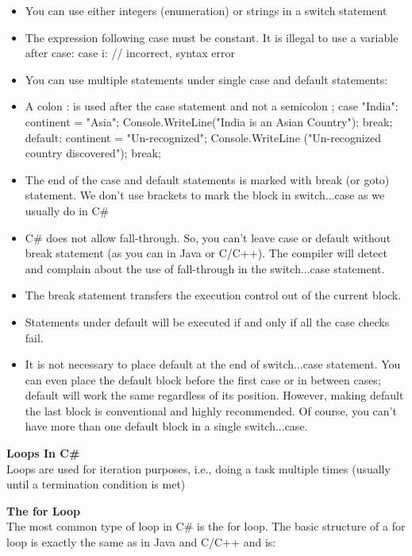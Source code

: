 \begin{itemize}
    \item You can use either integers (enumeration) or strings in a switch statement
    \item The expression following case must be constant. It is illegal to use a variable after case:
    case i: // incorrect, syntax error
    \item You can use multiple statements under single case and default statements:
    \item A colon : is used after the case statement and not a semicolon ;
    case "India":
    continent = "Asia";
    Console.WriteLine("India is an Asian Country");
    break;
    default:
    continent = "Un-recognized";
    Console.WriteLine
    ("Un-recognized country discovered");
    break;
    \item The end of the case and default statements is marked with break (or goto) statement. We don’t use {}
    brackets to mark the block in switch...case as we usually do in C\#
    \item C\# does not allow fall-through. So, you can’t leave case or default without break statement (as you can in
    Java or C/C++). The compiler will detect and complain about the use of fall-through in the switch...case
    statement.
    \item The break statement transfers the execution control out of the current block.
    \item Statements under default will be executed if and only if all the case checks fail.
    \item It is not necessary to place default at the end of switch...case statement. You can even place the default
    block before the first case or in between cases; default will work the same regardless of its position.
    However, making default the last block is conventional and highly recommended. Of course, you can’t
    have more than one default block in a single switch...case.
    
\end{itemize}


\textbf{Loops In C\#}\\
Loops are used for iteration purposes, i.e., doing a task multiple times (usually until a termination condition is met)

\textbf{The for Loop}\\
The most common type of loop in C\# is the for loop. The basic structure of a for loop is exactly the same as in Java
and C/C++ and is:

